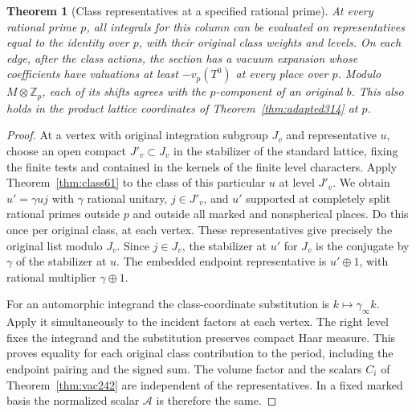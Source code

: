\documentclass[a4paper,11pt]{article}
\newtheorem{theorem}[proposition]{Theorem}
\theoremstyle{definition}
\theoremstyle{remark}
\newcommand{\ZZ}{\mathbb Z}\newcommand{\ord}{\operatorname{ord}}
\numberwithin{equation}{section}
\begin{document}
\begin{theorem}[Class representatives at a specified rational prime]\leavevmode
\label{thm:neutral315}
At every rational prime \(p\), all integrals for this column can
be evaluated on representatives equal to the identity over \(p\),
with their original class weights and levels. On each edge, after
the class actions, the section has a vacuum expansion whose
coefficients have valuations at least \(-v_p(T^0)\) at every
place over \(p\). Modulo \(M\otimes\ZZ_p\), each of its shifts
agrees with the \(p\)-component of an original \(b\).
This also holds in the product lattice coordinates of
Theorem~\ref{thm:adapted314} at \(p\).
\end{theorem}
\begin{proof}
At a vertex with original integration subgroup \(J_v\) and
representative \(u\), choose an open compact \(J'_v\subset J_v\)
in the stabilizer of the standard lattice, fixing the finite
tests and contained in the kernels of the finite level characters.
Apply Theorem~\ref{thm:class61} to the class of this particular
\(u\) at level \(J'_v\). We obtain \(u'=\gamma u j\) with
\(\gamma\) rational unitary, \(j\in J'_v\), and \(u'\) supported
at completely split rational primes outside \(p\) and outside
all marked and nonspherical places. Do this once per original
class, at each vertex. These representatives give precisely the
original list modulo \(J_v\). Since \(j\in J_v\), the stabilizer
at \(u'\) for \(J_v\) is the conjugate by \(\gamma\) of the
stabilizer at \(u\). The embedded endpoint representative is
\(u'\oplus1\), with rational multiplier \(\gamma\oplus1\).

For an automorphic integrand the class-coordinate substitution
is \(k\mapsto\gamma_\infty k\). Apply it simultaneously to
the incident factors at each vertex. The right level fixes the
integrand and the substitution preserves compact Haar measure.
This proves equality for each original class contribution to the
period, including the endpoint pairing and the signed sum.
The volume factor and the scalars \(C_i\) of
Theorem~\ref{thm:vac242} are independent of the representatives.
In a fixed marked basis the normalized scalar \(\mathcal A\)
is therefore the same.


\end{proof}
\end{document}
